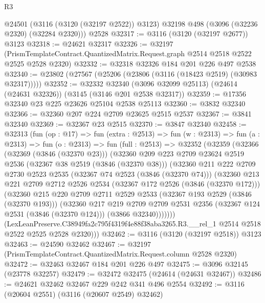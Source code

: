 \begin{lexlean}{R3}
\begin{coremodule}
    @24501 (@3116 (@3120 (@32197 @2522)) @3123) @32198 @498 (@3096 (@32236 @2320) (@32284 @2320)))
    @2528
@32317 := @3116 (@3120 (@32197 @2677)) @3123
@32318 := @24621 @32317
@32326 := @32197
    (PrismTemplateContract.QuantizedMatrix.Request.graph @2514 @2518 @2522 @2525 @2528 @2320)
@32332 := @32318 @32326 @184 @201 @226 @497 @2538
@32340 := @23802 (@27567 (@25206 (@23806 (@3116 (@18423 @2519) (@30983 @32317)))))
@32352 := @32332
    @32340
    (@3096 @32099 @25113)
    (@24614 (@24631 @32326))
    (@3145 (@3146 @201 @2538 @32317))
@32359 := @17356 @32340 @23 @225 @23626 @25104 @2538 @25113
@32360 := @3832 @32340
@32366 := @32360 @207 @224 @2709 @23625 @2515 @2537
@32367 := @3841 @32340
@32369 := @32367 @23 @2515
@32370 := @3847 @32340
@32458 := @32313
    (fun (op : @17) =>
    fun (extra : @2513) =>
    fun (w : @2313) =>
    fun (a : @2313) =>
    fun (o : @2313) =>
    fun (full : @2513) =>
    @32352
      (@32359
        (@32366
          (@32369 (@3846 (@32370 @23)))
          (@32360
            @209
            @223
            @2709
            @23624
            @2519
            @2536
            (@32367 @38 @2519 (@3846 (@32370 @38)))
            (@32360
              @211
              @222
              @2709
              @2730
              @2523
              @2535
              (@32367 @74 @2523 (@3846 (@32370 @74)))
              (@32360
                @213
                @221
                @2709
                @2712
                @2526
                @2534
                (@32367 @172 @2526 (@3846 (@32370 @172)))
                (@32360
                  @215
                  @220
                  @2709
                  @2711
                  @2529
                  @2533
                  (@32367 @193 @2529 (@3846 (@32370 @193)))
                  (@32360
                    @217
                    @219
                    @2709
                    @2709
                    @2531
                    @2356
                    (@32367 @124 @2531 (@3846 (@32370 @124)))
                    (@3866 @32340)))))))
        (LexLeanPreserve.C38949fa2c795f4319f4e88f38aba3265.R3.__rel_1
          @2514
          @2518
          @2522
          @2525
          @2528
          @2320)))
@32462 := @3116 (@3120 (@32197 @2518)) @3123
@32463 := @24590 @32462
@32467 := @32197 (PrismTemplateContract.QuantizedMatrix.Request.column @2528 @2320)
@32472 := @32463 @32467 @184 @201 @226 @497
@32475 := @3096 @32145 (@23778 @32257)
@32479 := @32472 @32475 (@24614 (@24631 @32467))
@32486 := @24621 @32462 @32467 @229 @242 @341 @496 @2554
@32492 := @3116 (@20604 @2551) (@3116 (@20607 @2549) @32462)

\end{coremodule}
\end{lexlean}
